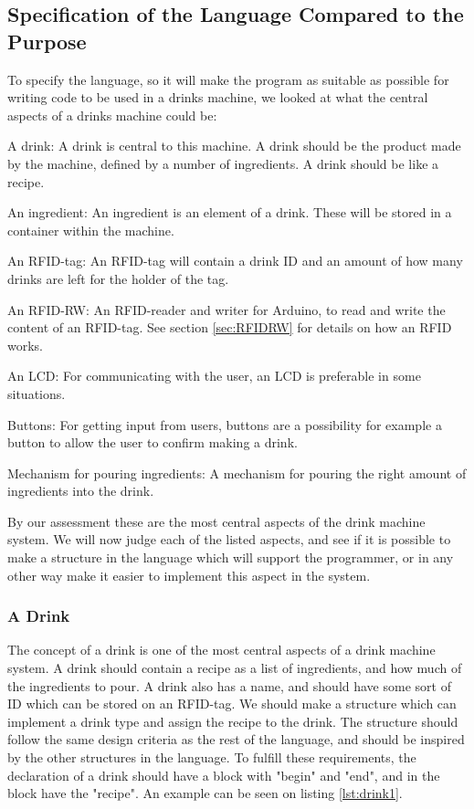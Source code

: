 \subsection{Specification of the Language Compared to the Purpose}
\label{sec:specific}
To specify the language, so it will make the program as suitable as possible for writing code to be used in a drinks machine, we looked at what the central aspects of a drinks machine could be:
\begin{inddes}
\item[A drink:] A drink is central to this machine. A drink should be the product made by the machine, defined by a number of ingredients. A drink should be like a recipe.
\item[An ingredient:] An ingredient is an element of a drink. These will be stored in a container within the machine. 
\item[An RFID-tag:] An RFID-tag will contain a drink ID and an amount of how many drinks are left for the holder of the tag.
\item[An RFID-RW:] An RFID-reader and writer for Arduino, to read and write the content of an RFID-tag. See section \ref{sec:RFIDRW} for details on how an RFID works.
\item[An LCD:] For communicating with the user, an LCD is preferable in some situations.
\item[Buttons:] For getting input from users, buttons are a possibility for example a button to allow the user to confirm making a drink. 
\item[Mechanism for pouring ingredients:] A mechanism for pouring the right amount of ingredients into the drink.
\end{inddes}
By our assessment these are the most central aspects of the drink machine system. We will now judge each of the listed aspects, and see if it is possible to make a structure in the language which will support the programmer, or in any other way make it easier to implement this aspect in the system.
\subsubsection{A Drink}
The concept of a drink is one of the most central aspects of a drink machine system. A drink should contain a recipe as a list of ingredients, and how much of the ingredients to pour. A drink also has a name, and should have some sort of ID which can be stored on an RFID-tag. We should make a structure which can implement a drink type and assign the recipe to the drink. The structure should follow the same design criteria as the rest of the language, and should be inspired by the other structures in the language. To fulfill these requirements, the declaration of a drink should have a block with "begin" and "end", and in the block have the "recipe". An example can be seen on listing \ref{lst:drink1}.

